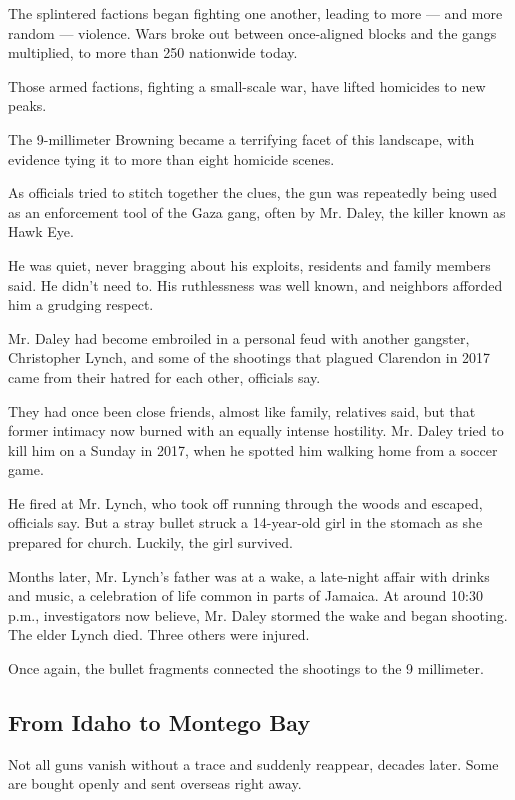 The splintered factions began fighting one another, leading to more ---
and more random --- violence. Wars broke out between once-aligned blocks
and the gangs multiplied, to more than 250 nationwide today.

Those armed factions, fighting a small-scale war, have lifted homicides
to new peaks.

The 9-millimeter Browning became a terrifying facet of this landscape,
with evidence tying it to more than eight homicide scenes.

As officials tried to stitch together the clues, the gun was repeatedly
being used as an enforcement tool of the Gaza gang, often by Mr. Daley,
the killer known as Hawk Eye.

He was quiet, never bragging about his exploits, residents and family
members said. He didn't need to. His ruthlessness was well known, and
neighbors afforded him a grudging respect.

Mr. Daley had become embroiled in a personal feud with another gangster,
Christopher Lynch, and some of the shootings that plagued Clarendon in
2017 came from their hatred for each other, officials say.

They had once been close friends, almost like family, relatives said,
but that former intimacy now burned with an equally intense hostility.
Mr. Daley tried to kill him on a Sunday in 2017, when he spotted him
walking home from a soccer game.

He fired at Mr. Lynch, who took off running through the woods and
escaped, officials say. But a stray bullet struck a 14-year-old girl in
the stomach as she prepared for church. Luckily, the girl survived.

Months later, Mr. Lynch's father was at a wake, a late-night affair with
drinks and music, a celebration of life common in parts of Jamaica. At
around 10:30 p.m., investigators now believe, Mr. Daley stormed the wake
and began shooting. The elder Lynch died. Three others were injured.

Once again, the bullet fragments connected the shootings to the 9
millimeter.

\hypertarget{from-idaho-to-montego-bay}{%
\subsection{From Idaho to Montego Bay}\label{from-idaho-to-montego-bay}}

Not all guns vanish without a trace and suddenly reappear, decades
later. Some are bought openly and sent overseas right away.

